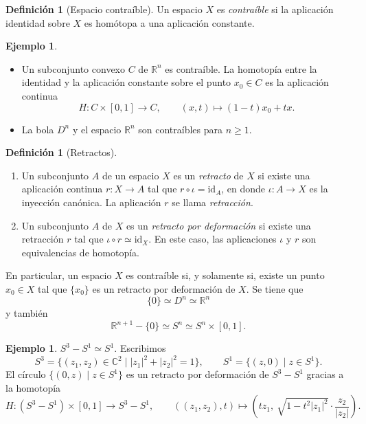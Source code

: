 \documentclass[11pt,a4paper]{article}
\theoremstyle{plain}
\theoremstyle{definition}
\newtheorem{definition}[theorem]{Definición}
\newtheorem{example}[theorem]{Ejemplo}
\theoremstyle{remark}
\newcommand{\RR}{\mathbb R}
\newcommand{\CC}{\mathbb C}
\begin{document}
\begin{definition}[Espacio contraíble]
\label{def:contraible}
Un espacio $X$ es \emph{contraíble} si la aplicación identidad sobre $X$ es
homótopa a una aplicación constante.
\end{definition}

\begin{example}
\label{ex:contraibles}
\begin{itemize}
\item Un subconjunto convexo $C$ de $\RR^n$ es contraíble. La homotopía
entre la identidad y la aplicación constante sobre el punto $x_0\in C$ es la
aplicación continua
\[
H:C\times[0,1]\to C, \qquad (x,t)\mapsto(1-t)x_0+tx.
\]
\item La bola $D^n$ y el espacio $\RR^n$ son contraíbles para $n\ge1$.
\end{itemize}
\end{example}

\begin{definition}[Retractos]
\label{def:retractos}
\begin{enumerate}[label=\arabic*.]
\item Un subconjunto $A$ de un espacio $X$ es un \emph{retracto} de $X$ si
existe una aplicación continua $r:X\to A$ tal que $r\circ\iota=\mathrm{id}_A$,
en donde $\iota:A\to X$ es la inyección canónica. La aplicación $r$ se llama
\emph{retracción}.
\item Un subconjunto $A$ de $X$ es un \emph{retracto por deformación} si
existe una retracción $r$ tal que $\iota\circ r\simeq\mathrm{id}_X$. En este
caso, las aplicaciones $\iota$ y $r$ son equivalencias de homotopía.
\end{enumerate}

En particular, un espacio $X$ es contraíble si, y solamente si, existe un
punto $x_0\in X$ tal que $\{x_0\}$ es un retracto por deformación de $X$. Se
tiene que
\[
\{0\}\simeq D^n\simeq\RR^n
\]
y también
\[
\RR^{n+1}-\{0\}\simeq S^n\simeq S^n\times[0,1].
\]
\end{definition}

\begin{example}
\label{ex:S3-S1}
$S^3-S^1\simeq S^1$. Escribimos
\[
S^3=\{(z_1,z_2)\in\CC^2 \mid |z_1|^2+|z_2|^2=1\}, \qquad
S^1=\{(z,0)\mid z\in S^1\}.
\]
El círculo $\{(0,z)\mid z\in S^1\}$ es un retracto por deformación de
$S^3-S^1$ gracias a la homotopía
\[
H:(S^3-S^1)\times[0,1]\to S^3-S^1, \qquad
((z_1,z_2),t)\mapsto\left(tz_1,\ \sqrt{1-t^2|z_1|^2}\cdot\frac{z_2}{|z_2|}\right).
\]
\end{example}
\end{document}
